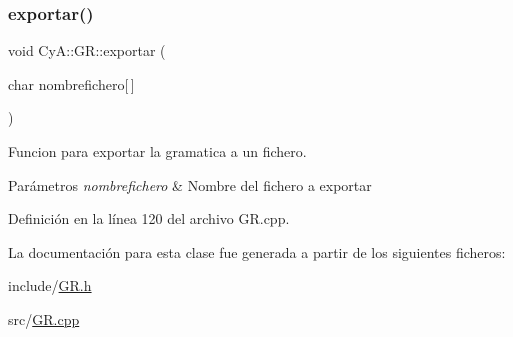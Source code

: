 \subsubsection{\texorpdfstring{exportar()}{exportar()}}
{\footnotesize\ttfamily void Cy\+A\+::\+G\+R\+::exportar (\begin{DoxyParamCaption}\item[{char}]{nombrefichero\mbox{[}$\,$\mbox{]} }\end{DoxyParamCaption})}



Funcion para exportar la gramatica a un fichero. 


\begin{DoxyParams}{Parámetros}
{\em nombrefichero} & Nombre del fichero a exportar \\
\hline
\end{DoxyParams}


Definición en la línea 120 del archivo G\+R.\+cpp.



La documentación para esta clase fue generada a partir de los siguientes ficheros\+:\begin{DoxyCompactItemize}
\item 
include/\mbox{\hyperlink{_g_r_8h}{G\+R.\+h}}\item 
src/\mbox{\hyperlink{_g_r_8cpp}{G\+R.\+cpp}}\end{DoxyCompactItemize}
